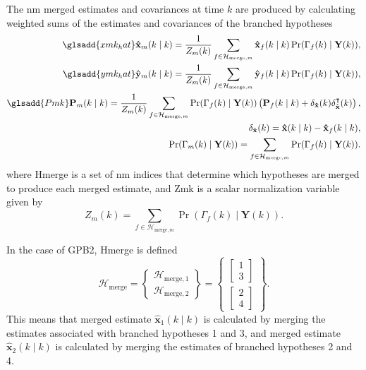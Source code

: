 The \gls{nm} merged estimates and covariances at time $k$ are produced by calculating weighted sums of the estimates and covariances of the branched hypotheses
\begin{equation} \label{eq:xmkymk_hat_MKF}
	\begin{aligned}
		\glsadd{xmk_hat}\mathbf{\hat{x}}_m(k \mid k) = \frac{1}{Z_m(k)} \sum_{f \in \mathcal{H}_{\text{merge},m}} \mathbf{\hat{x}}_f(k \mid k) \Pr(\Gamma_f(k) \mid \mathbf{Y}(k)), \\
		\glsadd{ymk_hat}\mathbf{\hat{y}}_m(k \mid k) = \frac{1}{Z_m(k)} \sum_{f \in \mathcal{H}_{\text{merge},m}} \mathbf{\hat{y}}_f(k \mid k) \Pr(\Gamma_f(k) \mid \mathbf{Y}(k)),\\
		\glsadd{Pmk}\mathbf{P}_m(k \mid k) = \frac{1}{Z_m(k)} \sum_{f \in \mathcal{H}_{\text{merge},m}} \Pr(\Gamma_f(k) \mid \mathbf{Y}(k)) \left( \mathbf{P}_f(k \mid k) + \delta_\mathbf{\hat{x}}(k) \delta_\mathbf{\hat{x}}^\intercal(k) \right), \\
		\delta_\mathbf{\hat{x}}(k) = \mathbf{\hat{x}}(k \mid k) - \mathbf{\hat{x}}_f(k \mid k), \\
		\Pr(\Gamma_m(k) \mid \mathbf{Y}(k)) = \sum_{f \in \mathcal{H}_{\text{merge},m}} \Pr(\Gamma_f(k) \mid \mathbf{Y}(k)).
	\end{aligned}
\end{equation}
where \gls{Hmerge} is a set of \gls{nm} indices that determine which hypotheses are merged to produce each merged estimate, and \gls{Zmk} is a scalar normalization variable given by
\begin{equation} \label{eq:Zmk}
	Z_m(k) = \sum_{f \in \mathcal{H}_{\text{merge},m}} \Pr(\Gamma_f(k) \mid \mathbf{Y}(k)).
\end{equation}

In the case of \gls{GPB2}, \gls{Hmerge} is defined
\begin{equation} \label{eq:Hmerge_GPB2}
	\mathcal{H}_{\text{merge}} = \begin{Bmatrix} \mathcal{H}_{\text{merge},1} \\ \mathcal{H}_{\text{merge},2} \end{Bmatrix} = \begin{Bmatrix}
		\begin{bmatrix}	1 \\ 3 \end{bmatrix} \\
		\begin{bmatrix}	2 \\ 4 \end{bmatrix}
	\end{Bmatrix}.
\end{equation}
This means that merged estimate $\mathbf{\hat{x}}_1(k \mid k)$ is calculated by merging the estimates associated with branched hypotheses 1 and 3, and merged estimate $\mathbf{\hat{x}}_2(k \mid k)$ is calculated by merging the estimates of branched hypotheses 2 and 4.

